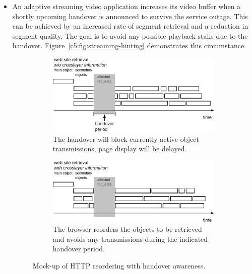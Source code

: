 \begin{itemize}
	\item An adaptive streaming video application increases its video buffer when a shortly upcoming handover is announced to survive the service outage. This can be achieved by an increased rate of segment retrieval and a reduction in segment quality. The goal is to avoid any possible playback stalls due to the handover. Figure~\ref{c5:fig:streaming-hinting} demonstrates this circumstance.

	\begin{figure}[htb]
	        \centering
	        \begin{subfigure}[b]{0.90\textwidth}
	            \centering
				\includegraphics[width=\textwidth]{images/http-reorder-no-cl.pdf}
				\caption{The handover will block currently active object transmissions, page display will be delayed.}
				\label{c5:fig:http-reorder-no-cl}
	        \end{subfigure}%

	        \begin{subfigure}[b]{0.90\textwidth}
				\centering
				\includegraphics[width=\textwidth]{images/http-reorder-cl.pdf}
				\caption{The browser reorders the objects to be retrieved and avoids any transmissions during the indicated handover period.}
				\label{c5:fig:http-reorder-cl}
			   \end{subfigure}%
	 \caption{Mock-up of \gls{HTTP} reordering with handover awareness.}
	\label{c5:fig:http-reorder}
	\end{figure}


\end{itemize}
